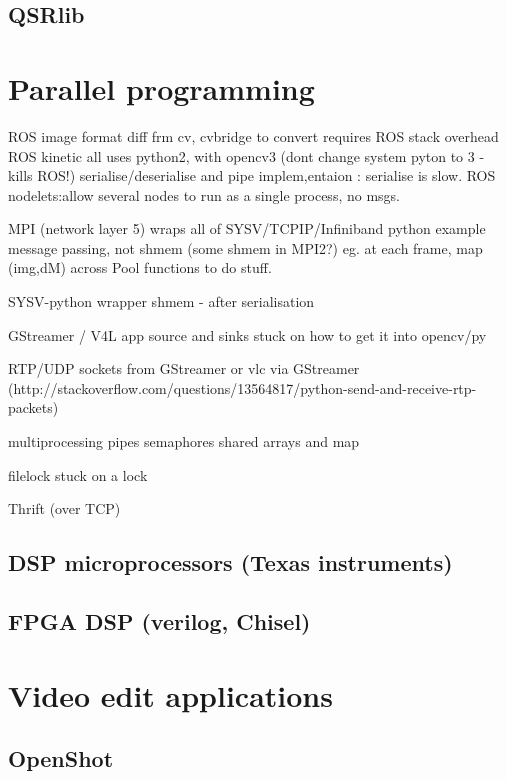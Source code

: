 \documentclass[oneside,english]{scrbook}
\begin{document}
\section{QSRlib}



\chapter{Parallel programming}

ROS image format diff frm cv, cvbridge to convert requires ROS stack
overhead ROS kinetic all uses python2, with opencv3 (dont change system
pyton to 3 - kills ROS!) serialise/deserialise and pipe implem,entaion
: serialise is slow. ROS nodelets:allow several nodes to run as a
single process, no msgs.

MPI (network layer 5) wraps all of SYSV/TCPIP/Infiniband python example
message passing, not shmem (some shmem in MPI2?) eg. at each frame,
map (img,dM) across Pool functions to do stuff.

SYSV-python wrapper shmem - after serialisation

GStreamer / V4L app source and sinks stuck on how to get it into opencv/py

RTP/UDP sockets from GStreamer or vlc via GStreamer (http://stackoverflow.com/questions/13564817/python-send-and-receive-rtp-packets)

multiprocessing pipes semaphores shared arrays and map

filelock stuck on a lock

Thrift (over TCP)


\section{DSP microprocessors (Texas instruments)}

\section{FPGA DSP (verilog, Chisel)}




\chapter{Video edit applications}

\section{OpenShot}
\end{document}
